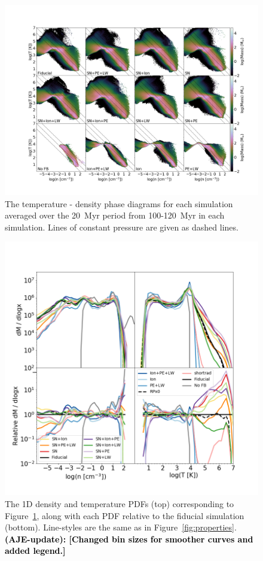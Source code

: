 \documentclass[twocolumn]{aastex62}
\newcommand{\changed}[1]{\textcolor{black}{\textbf{(AJE-update): #1}}}
\begin{document}
\begin{figure}
  \centering
  \includegraphics[width=0.95\linewidth]{figures/phase_plot_nT_disk_4x2}
  \caption{The temperature - density phase diagrams for each simulation averaged over the 20~Myr period from 100-120~Myr in each simulation. Lines of constant pressure are given as dashed lines.}
  \label{fig:phase_diagram}
\end{figure}

\begin{figure}
  \centering
  \includegraphics[width=0.95\linewidth]{figures/1D_phase_plot_2panel_nT_phase_disk}
  \caption{The 1D density and temperature PDFs (top) corresponding to Figure~\ref{fig:phase_diagram}, along with each PDF relative to the fiducial simulation (bottom). Line-styles are the same as in Figure~\ref{fig:properties}. \changed{[Changed bin sizes for smoother curves and added legend.]}}
  \label{fig:1D_phase}
\end{figure}
\end{document}
